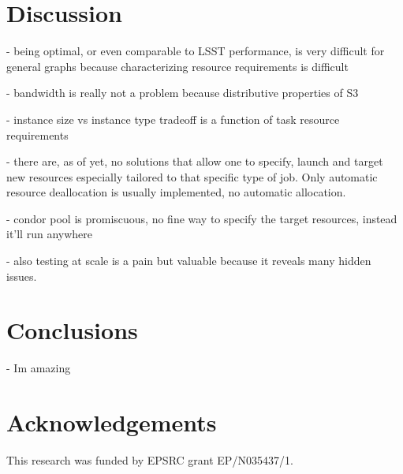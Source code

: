 \documentclass[a4paper, 10pt, conference]{ieeeconf}
\begin{document}
\section{Discussion}
- being optimal, or even comparable to LSST performance, is very difficult for general graphs because characterizing resource requirements is difficult

- bandwidth is really not a problem because distributive properties of S3

- instance size vs instance type tradeoff is a function of task resource requirements

- there are, as of yet, no solutions that allow one to specify, launch and target new resources especially tailored to that specific type of job. Only automatic resource deallocation is usually implemented, no automatic allocation. 

- condor pool is promiscuous, no fine way to specify the target resources, instead it'll run anywhere

- also testing at scale is a pain but valuable because it reveals many hidden issues.

\section{Conclusions}

- Im amazing








\section{Acknowledgements}
\noindent This research was funded by EPSRC grant EP/N035437/1.
\clearpage
\end{document}
